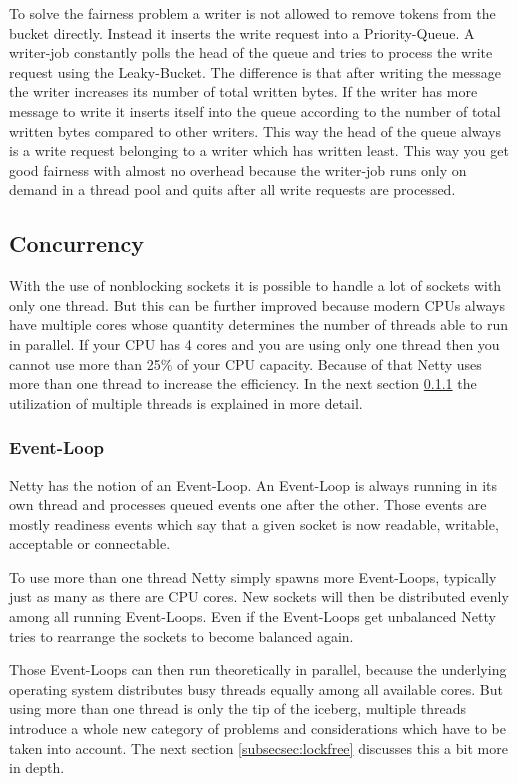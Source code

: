 To solve the fairness problem a writer is not allowed to remove tokens from the bucket directly. Instead it inserts the write request into a Priority-Queue. A writer-job constantly polls the head of the queue and tries to process the write request using the Leaky-Bucket. The difference is that after writing the message the writer increases its number of total written bytes. If the writer has more message to write it inserts itself into the queue according to the number of total written bytes compared to other writers. This way the head of the queue always is a write request belonging to a writer which has written least. This way you get good fairness with almost no overhead because the writer-job runs only on demand in a thread pool and quits after all write requests are processed.

\cleardoublepage
\subsection{Concurrency}
With the use of nonblocking sockets it is possible to handle a lot of sockets with only one thread. But this can be further improved because modern CPUs always have multiple cores whose quantity determines the number of threads able to run in parallel. If your CPU has 4 cores and you are using only one thread then you cannot use more than 25\% of your CPU capacity. Because of that Netty uses more than one thread to increase the efficiency. In the next section \ref{subsecsec:eventloop} the utilization of multiple threads is explained in more detail.

\subsubsection{Event-Loop}
\label{subsecsec:eventloop}
Netty has the notion of an Event-Loop. An Event-Loop is always running in its own thread and processes queued events one after the other. Those events are mostly readiness events which say that a given socket is now readable, writable, acceptable or connectable.

To use more than one thread Netty simply spawns more Event-Loops, typically just as many as there are CPU cores. New sockets will then be distributed evenly among all running Event-Loops. Even if the Event-Loops get unbalanced Netty tries to rearrange the sockets to become balanced again.

Those Event-Loops can then run theoretically in parallel, because the underlying operating system distributes busy threads equally among all available cores. But using more than one thread is only the tip of the iceberg, multiple threads introduce a whole new category of problems and considerations which have to be taken into account. The next section \ref{subsecsec:lockfree} discusses this a bit more in depth.


